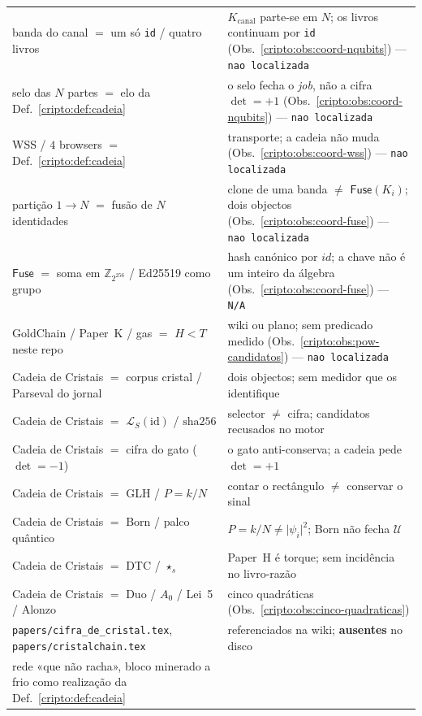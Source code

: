 \documentclass[11pt,a4paper]{article}
\newcommand{\code}[1]{\texttt{\small #1}}
\begin{document}
\begin{center}
\begin{tabular}{@{}p{}p{}@{}}
banda do canal $=$ um só \code{id} / quatro livros
  & $K_{\mathrm{canal}}$ parte-se em $N$; os livros continuam por \code{id}
    (Obs.~\ref{cripto:obs:coord-nqubits}) --- \texttt{nao localizada} \\
selo das $N$ partes $=$ elo da Def.~\ref{cripto:def:cadeia}
  & o selo fecha o \emph{job}, não a cifra $\det=+1$
    (Obs.~\ref{cripto:obs:coord-nqubits}) --- \texttt{nao localizada} \\
WSS / $4$ browsers $=$ Def.~\ref{cripto:def:cadeia}
  & transporte; a cadeia não muda
    (Obs.~\ref{cripto:obs:coord-wss}) --- \texttt{nao localizada} \\
partição $1\to N$ $=$ fusão de $N$ identidades
  & clone de uma banda $\neq$ $\mathsf{Fuse}(K_i)$; dois objectos
    (Obs.~\ref{cripto:obs:coord-fuse}) --- \texttt{nao localizada} \\
$\mathsf{Fuse}$ $=$ soma em $\mathbb{Z}_{2^{256}}$ / Ed25519 como grupo
  & hash canónico por $id$; a chave não é um inteiro da álgebra
    (Obs.~\ref{cripto:obs:coord-fuse}) --- \texttt{N/A} \\
GoldChain / Paper~K / gas $=$ $H<T$ neste repo
  & wiki ou plano; sem predicado medido
    (Obs.~\ref{cripto:obs:pow-candidatos}) --- \texttt{nao localizada} \\
Cadeia de Cristais $=$ corpus cristal / Parseval do jornal
  & dois objectos; sem medidor que os identifique \\
Cadeia de Cristais $=$ $\mathcal{L}_{S}(\mathrm{id})$ / $\mathrm{sha256}$
  & selector $\neq$ cifra; candidatos recusados no motor \\
Cadeia de Cristais $=$ cifra do gato ($\det=-1$)
  & o gato anti-conserva; a cadeia pede $\det=+1$ \\
Cadeia de Cristais $=$ GLH / $P=k/N$
  & contar o rectângulo $\neq$ conservar o sinal \\
Cadeia de Cristais $=$ Born / palco quântico
  & $P=k/N\neq\lvert\psi_{i}\rvert^{2}$; Born não fecha $\mathcal{U}$ \\
Cadeia de Cristais $=$ DTC / $\star_{s}$
  & Paper~H é torque; sem incidência no livro-razão \\
Cadeia de Cristais $=$ Duo / $A_0$ / Lei~5 / Alonzo
  & cinco quadráticas (Obs.~\ref{cripto:obs:cinco-quadraticas}) \\
\code{papers/cifra\_de\_cristal.tex},
\code{papers/cristalchain.tex}
  & referenciados na wiki; \textbf{ausentes} no disco \\
rede «que não racha», bloco minerado a frio
    como realização da Def.~\ref{cripto:def:cadeia}

\end{tabular}
\end{center}
\end{document}
